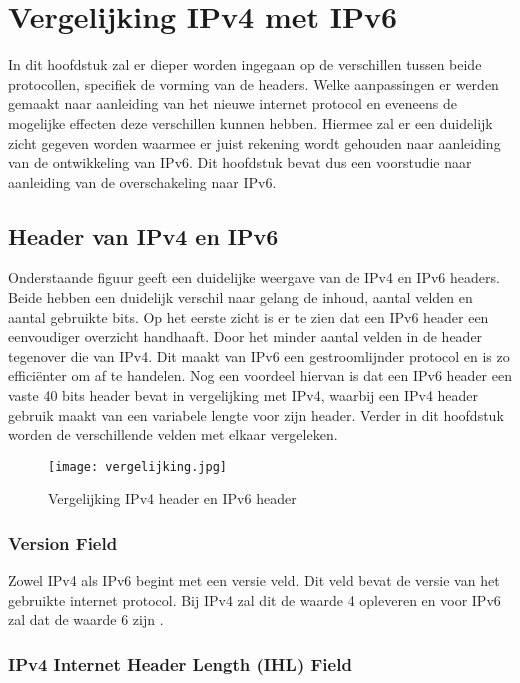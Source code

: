 
\chapter{Vergelijking IPv4 met IPv6}
\label{ch:h2}

In dit hoofdstuk zal er dieper worden ingegaan op de verschillen tussen beide protocollen, specifiek de vorming van de headers. Welke aanpassingen er werden gemaakt naar aanleiding van het nieuwe internet protocol en eveneens de mogelijke effecten deze verschillen kunnen hebben. Hiermee zal er een duidelijk zicht gegeven worden waarmee er juist rekening wordt gehouden naar aanleiding van de ontwikkeling van IPv6. Dit hoofdstuk bevat dus een voorstudie naar aanleiding van de overschakeling naar IPv6.

\section{Header van IPv4 en IPv6}

Onderstaande figuur geeft een duidelijke weergave van de IPv4 en IPv6 headers. Beide hebben een duidelijk verschil naar gelang de inhoud, aantal velden en aantal gebruikte bits. Op het eerste zicht is er te zien dat een IPv6 header een eenvoudiger overzicht handhaaft. Door het minder aantal velden in de header tegenover die van IPv4. Dit maakt van IPv6 een gestroomlijnder protocol en is zo efficiënter om af te handelen. Nog een voordeel hiervan is dat een IPv6 header een vaste 40 bits header bevat in vergelijking met IPv4, waarbij een IPv4 header gebruik maakt van een variabele lengte voor zijn header. Verder in dit hoofdstuk worden de verschillende velden met elkaar vergeleken.


\begin{figure}
\texttt{[image: vergelijking.jpg]}
\centering
\caption{Vergelijking IPv4 header en IPv6 header \autocite{4vs6}}
\centering
\end{figure}

\subsection{Version Field}

Zowel IPv4 als IPv6 begint met een versie veld. Dit veld bevat de versie van het gebruikte internet protocol. Bij IPv4 zal dit de waarde 4 opleveren en voor IPv6 zal dat de waarde 6 zijn \autocite{Graziani2017}.

\subsection{IPv4 Internet Header Length (IHL) Field}

